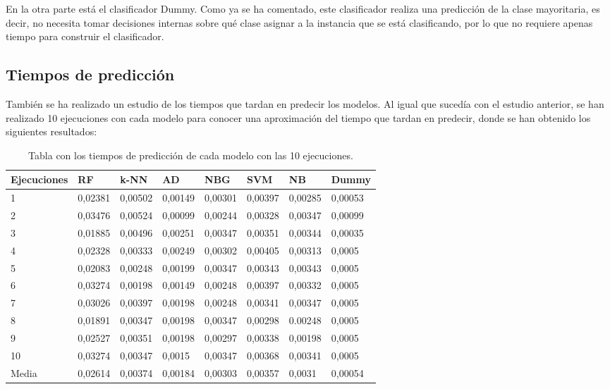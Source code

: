 En la otra parte está el clasificador Dummy. Como ya se ha comentado, este clasificador realiza una predicción de la clase mayoritaria, es decir, no necesita tomar decisiones internas sobre qué clase asignar a la instancia que se está clasificando, por lo que no requiere apenas tiempo para construir el clasificador.

\subsection{Tiempos de predicción}
También se ha realizado un estudio de los tiempos que tardan en predecir los modelos. Al igual que sucedía con el estudio anterior, se han realizado 10 ejecuciones con cada modelo para conocer una aproximación del tiempo que tardan en predecir, donde se han obtenido los siguientes resultados:

\begin{table}[h]
	\small 
	\begin{center}
		\begin{tabular}{ l l l l l l l l }
			\hline
			\textbf{Ejecuciones} & \textbf{RF} & \textbf{k-NN} & \textbf{AD} & \textbf{NBG} & \textbf{SVM} & \textbf{NB} & \textbf{Dummy} \\ \hline
			1 & 0,02381 & 0,00502 & 0,00149 & 0,00301 & 0,00397 & 0,00285 & 0,00053 \\
			2 & 0,03476 & 0,00524 & 0,00099 & 0,00244 & 0,00328 & 0,00347 & 0,00099 \\ 
			3 & 0,01885 & 0,00496 & 0,00251 & 0,00347 & 0,00351 & 0,00344 & 0,00035 \\
			4 & 0,02328 & 0,00333 & 0,00249 & 0,00302 & 0,00405 & 0,00313 & 0,0005 \\
			5 & 0,02083 & 0,00248 & 0,00199 & 0,00347 & 0,00343 & 0,00343 & 0,0005 \\
			6 & 0,03274 & 0,00198 & 0,00149 & 0,00248 & 0,00397 & 0,00332 & 0,0005 \\
			7 & 0,03026 & 0,00397 & 0,00198 & 0,00248 & 0,00341 & 0,00347 & 0,0005 \\
			8 & 0,01891 & 0,00347 & 0,00198 & 0,00347 & 0,00298 & 0.00248 & 0,0005 \\
			9 & 0,02527 & 0,00351 & 0,00198 & 0,00297 & 0,00338 & 0,00198 & 0,0005 \\
			10 & 0,03274 & 0,00347 & 0,0015 & 0,00347 & 0,00368 & 0,00341 & 0,0005 \\ \hline
			Media & 0,02614 & 0,00374 & 0,00184 & 0,00303 & 0,00357 & 0,0031 & 0,00054 \\ \hline
		\end{tabular}
		\caption{Tabla con los tiempos de predicción de cada modelo con las 10 ejecuciones.}
		\label{tab:tiempos_pred}
	\end{center}
\end{table}
 
